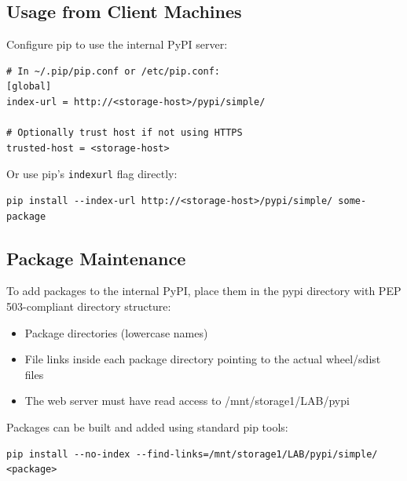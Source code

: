 \subsection{Usage from Client Machines}

Configure pip to use the internal PyPI server:
\begin{lstlisting}[style=mystyle]
# In ~/.pip/pip.conf or /etc/pip.conf:
[global]
index-url = http://<storage-host>/pypi/simple/

# Optionally trust host if not using HTTPS
trusted-host = <storage-host>
    \end{lstlisting}

Or use pip's \texttt{\-\-index\-url} flag directly:
\begin{lstlisting}[style=mystyle]
pip install --index-url http://<storage-host>/pypi/simple/ some-package
    \end{lstlisting}

\subsection{Package Maintenance}

To add packages to the internal PyPI, place them in the pypi directory with PEP 503-compliant directory structure:
\begin{itemize}
    \item Package directories (lowercase names)
    
    \item File links inside each package directory pointing to the actual wheel/sdist files
    
    \item The web server must have read access to /mnt/storage1/LAB/pypi
\end{itemize}

Packages can be built and added using standard pip tools:
\begin{lstlisting}[style=mystyle]
pip install --no-index --find-links=/mnt/storage1/LAB/pypi/simple/ <package>
    \end{lstlisting}

